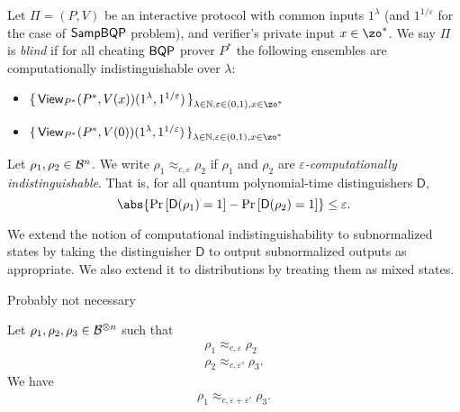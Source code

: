 \begin{definition}
	Let $\Pi=(P, V)$ be an interactive protocol with common inputs $1^\lambda$ (and $1^{1/\varepsilon}$ for the case of $\operatorname{\mathsf{SampBQP}}$ problem), and verifier's private input $x\in\zo^*$.
	We say $\Pi$ is \emph{blind} if for all cheating $\operatorname{\mathsf{BQP}}$ prover $P^*$ the following ensembles are computationally indistinguishable over $\lambda$:
	\begin{itemize}
		\item $\set{\View_{P^*}(P^*, V(x))(1^\lambda, 1^{1/\varepsilon})}_{\lambda\in\bbN, \varepsilon\in(0,1), x\in\zo^*}$
		\item $\set{\View_{P^*}(P^*, V(0))(1^\lambda, 1^{1/\varepsilon})}_{\lambda\in\bbN, \varepsilon\in(0,1), x\in\zo^*}$
	\end{itemize}
\end{definition}

\begin{definition}
\label{def:comp-indis}
	Let $\rho_1,\rho_2\in\mathcal{B}^n$.
	We write $\rho_1\approx_{c,\varepsilon}\rho_2$ if $\rho_1$ and $\rho_2$ are \emph{$\varepsilon$-computationally indistinguishable}.
	That is, for all quantum polynomial-time  distinguishers $\mathsf{D}$,
	$$\abs{\Pr\left[\mathsf{D}(\rho_1)=1\right]-\Pr\left[\mathsf{D}(\rho_2)=1\right]}\leq\varepsilon.$$
\end{definition}
We extend the notion of computational indistinguishability to subnormalized states by taking the distinguisher $\mathsf{D}$ to output subnormalized outputs as appropriate.
We also extend it to distributions by treating them as mixed states.

\iffalse

Probably not necessary

\begin{lem} \label{lem:computational-triangle0}
    Let $\rho_1, \rho_2, \rho_3\in\mathcal{B}^{\otimes n}$ such that 
    \begin{align}
		\rho_1\approx_{c, \varepsilon}\rho_2\\
		\rho_2\approx_{c, \varepsilon'}\rho_3.
    \end{align}
    We have 
    \begin{align}
		\rho_1\approx_{c, \varepsilon+\varepsilon'}\rho_3.
    \end{align}
\end{lem}

